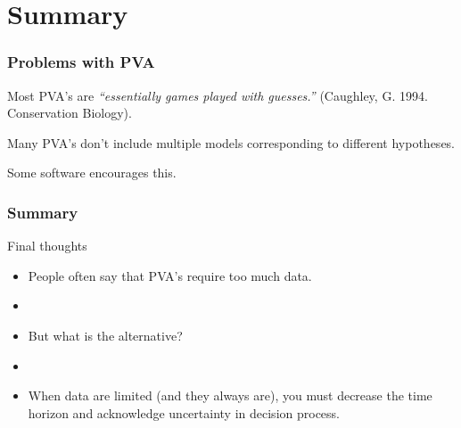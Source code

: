 \documentclass[color=usenames,dvipsnames]{beamer}\usepackage[]{graphicx}\usepackage[]{color}
\begin{document}
\section{Summary}



\begin{frame}
  \frametitle{Problems with PVA}
  \large
  Most PVA's are {\it ``essentially games played with
    guesses.''} (Caughley, G. 1994. Conservation Biology). \par
  \pause
  \vspace{0.5cm}
  Many PVA's don't include multiple models corresponding to different
  hypotheses. \par
  \pause
  \vspace{0.5cm}
  {Some software encourages this. \\}
\end{frame}




\begin{frame}
  \frametitle{Summary}
  \large
  {Final thoughts}
  \begin{itemize}%
    \item<1-> People often say that PVA's require too much data.
    \item[]
    \item<2-> But what is the alternative?
    \item[]
    \item<3-> When data are limited (and they always are), you must
      decrease the time horizon and acknowledge uncertainty in decision process. 
  \end{itemize}
\end{frame}
\end{document}
